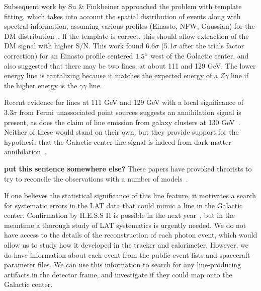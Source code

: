 \documentclass[aps,twocolumn,prd,superscriptaddress,showpacs,nofootinbib,fixfloat]{revtex4}
\newcommand{\degree}{^{\rm o}}
\begin{document}
Subsequent work by Su \& Finkbeiner approached the problem
with template fitting, which takes into account the spatial
distribution of events along with spectral information, assuming
various profiles (Einasto, NFW, Gaussian) for the DM
distribution~\citep{linepaper}.  If the template is correct,
this should allow extraction of the DM signal with higher
S/N.  This work found 6.6$\sigma$ (5.1$\sigma$ after the
trials factor correction) for an Einasto profile centered
$1.5\degree$ west of the Galactic center, and also suggested
that there may be two lines, at about 111 and 129 GeV.  The
lower energy line is tantalizing because it matches the
expected energy of a $Z\gamma$ line if the higher energy is
the $\gamma\gamma$ line.  

Recent evidence for lines at 111
GeV and 129 GeV with a local significance of $3.3\sigma$
from Fermi unassociated point sources suggests an annihilation signal is
present, as does the claim of line emission from galaxy clusters at 130
GeV~\cite{galaxyclusters}.  Neither of these would stand on their own, but
they provide support for the hypothesis that the Galactic center line signal
is indeed from dark matter annihilation~\cite{doubleline}.

{\bf put this sentence somewhere else?}
These papers have provoked theorists to try to reconcile the
observations with a number of models~\citep{Dudas:2012,
  Choi:2012, Kyae:2012, Lee:2012, Rajaraman:2012,
  Acharya:2012, Garny:2012, Buckley:2012, Chu:2012,
  Kang:2012, Buchmuller:2012, Heo:2012, Park:2012,
  Tulin:2012, Cline:2012, Weiner:2012}. 

If one believes the statistical significance of this line feature, it
motivates a search for systematic errors in the LAT data that could mimic a
line in the Galactic center.  Confirmation by H.E.S.S II is possible in the
next year~\cite{Bergstrom:2012}, but in the meantime a thorough study of LAT
systematics is urgently needed.  We do not have access to the details of the
reconstruction of each photon event, which would allow us to study how it
developed in the tracker and calorimeter.  However, we do have information
about each event from the public event lists and spacecraft parameter files.
We can use this information to search for any line-producing artifacts in the
detector frame, and investigate if they could map onto the Galactic center. 
\end{document}
